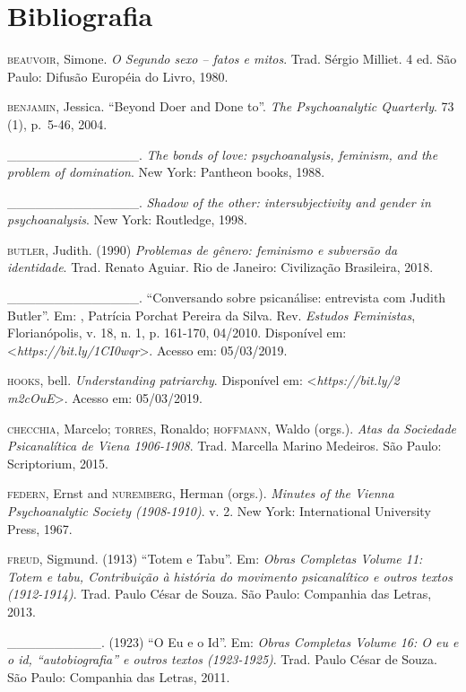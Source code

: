 \pagebreak

\section{Bibliografia}

\begin{Parskip}
\textsc{beauvoir}, Simone. \emph{O Segundo sexo -- fatos e mitos}. Trad. Sérgio
Milliet. 4 ed. São Paulo: Difusão Européia do Livro, 1980.

\textsc{benjamin}, Jessica. ``Beyond Doer and Done to''. \emph{The Psychoanalytic Quarterly}. 73
(1), p.~5-46, 2004.

\_\_\_\_\_\_\_\_\_\_\_\_\_\_. \emph{The bonds of love: psychoanalysis,
feminism, and the problem of domination}. New York: Pantheon books, 1988.

\_\_\_\_\_\_\_\_\_\_\_\_\_\_. \emph{Shadow of the other:
intersubjectivity and gender in psychoanalysis}. New York: Routledge, 1998.

\textsc{butler}, Judith. (1990) \emph{Problemas de gênero: feminismo e subversão da
identidade}. Trad. Renato Aguiar. Rio de Janeiro: Civilização Brasileira, 2018.

\_\_\_\_\_\_\_\_\_\_\_\_\_\_. ``Conversando sobre psicanálise: entrevista com Judith
Butler''. Em: , Patrícia Porchat Pereira da Silva. Rev. \emph{Estudos Feministas},
Florianópolis, v. 18, n. 1, p. 161-170, 04/2010. Disponível em:
\textless{}\emph{https://bit.ly/1CI0wqr}\textgreater{}.
Acesso em: 05/03/2019.

\textsc{hooks}, bell. \emph{Understanding patriarchy}. Disponível
em: \textless{}\emph{https://bit.ly/2\\m2cOuE}\textgreater{}. Acesso em: 05/03/2019.

\textsc{checchia}, Marcelo; \textsc{torres}, Ronaldo; \textsc{hoffmann},
Waldo (orgs.). \emph{Atas da Sociedade Psicanalítica de Viena 1906-1908}. Trad. Marcella
Marino Medeiros. São Paulo: Scriptorium, 2015.

\textsc{federn}, Ernst and \textsc{nuremberg}, Herman (orgs.). \emph{Minutes of the Vienna Psychoanalytic Society (1908-1910)}. v. 2. New York: International University Press, 1967.

\textsc{freud}, Sigmund. (1913) ``Totem e Tabu''. Em: \emph{Obras Completas Volume 11: Totem
e tabu, Contribuição à história do movimento psicanalítico e outros
textos (1912-1914)}. Trad. Paulo César de Souza. São Paulo: Companhia das Letras, 2013.

\_\_\_\_\_\_\_\_\_\_. (1923) ``O Eu e o Id''. Em: \emph{Obras Completas Volume
16: O eu e o id, ``autobiografia'' e outros textos (1923-1925)}. Trad.
Paulo César de Souza. São Paulo: Companhia das Letras, 2011.


\end{Parskip}
